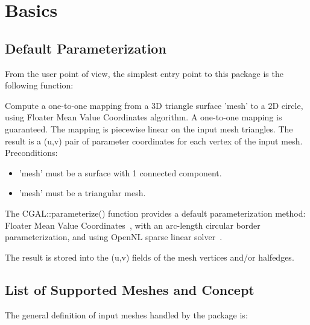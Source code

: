\section{Basics}


\subsection{Default Parameterization}

From the user point of view, the simplest entry point to this package
is the following function:

{
Compute a one-to-one mapping from a 3D triangle surface 'mesh' to a 2D circle, using Floater Mean Value Coordinates algorithm. A one-to-one mapping is guaranteed.
The mapping is piecewise linear on the input mesh triangles. The result is a (u,v) pair of parameter coordinates for each vertex of the input mesh.
Preconditions:\begin{itemize}
\item 'mesh' must be a surface with 1 connected component.\item 'mesh' must be a triangular mesh.\end{itemize}
}

The CGAL::parameterize() function provides a default parameterization
method: Floater Mean Value Coordinates~\cite{cgal:f-mvc-03}, with an
arc-length circular border parameterization, and using OpenNL sparse
linear solver~\cite{cgal:l-nmdgp-05}.

The result is stored into the (u,v) fields of the mesh vertices and/or
halfedges.


\subsection{List of Supported Meshes and Concept}

The general definition of input meshes handled by the package is:

